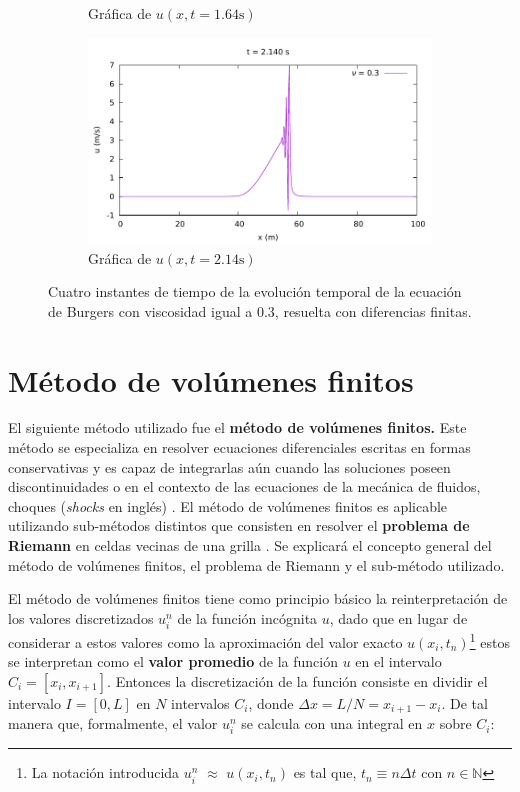 \documentclass[12pt]{article}
\begin{document}
\begin{figure}[ht]
\begin{subfigure}[b]{0.4\textwidth}
			\caption*{Gráfica de $u(x,t=1.64\unit{\second})$}
			\label{fig:vis0.3-3}
		\end{subfigure}
		\hfill
		\begin{subfigure}[b]{0.4\textwidth}
			\includegraphics[width=\textwidth]{../burg-vis1DDF/results/frames0.3/frame107.pdf}
			\caption*{Gráfica de $u(x,t=2.14\unit{\second})$}
			\label{fig:vis0.3-4}
		\end{subfigure}
		\caption{Cuatro instantes de tiempo de la evolución temporal de la ecuación de Burgers con viscosidad igual a $0.3$, resuelta con diferencias finitas.}
		\label{fig:instantes-nu0.3}
	\end{figure}
	
	\section{Método de volúmenes finitos}
	El siguiente método utilizado fue el \textbf{método de volúmenes finitos.} Este método se especializa en resolver ecuaciones diferenciales escritas en formas conservativas y es capaz de integrarlas aún cuando las soluciones poseen discontinuidades o  en el contexto de las ecuaciones de la mecánica de fluidos, choques (\textit{shocks} en inglés) \cite{LeVeque1998}. El método de volúmenes finitos es aplicable utilizando sub-métodos distintos que consisten en resolver el \textbf{problema de Riemann} en celdas vecinas de una grilla \cite{LeVeque1998}. Se explicará el concepto general del método de volúmenes finitos, el problema de Riemann y el sub-método utilizado.
	
	El método de volúmenes finitos tiene como principio básico la reinterpretación de los valores discretizados $u_{i}^{n}$ de la función incógnita $u$, dado que en lugar de considerar a estos valores como la aproximación del valor exacto $u(x_{i}, t_{n}) $\footnote{La notación introducida $u_{i}^{n}$ $\approx$ $u(x_{i}, t_{n})$ es tal que, $t_n \equiv n \Delta t $ con $n \in \mathbb{N}$} estos se interpretan como el \textbf{valor promedio} de la función $u$ en el intervalo $C_{i} = \left[ x_i, x_{i+1} \right]$. Entonces la discretización de la función consiste en dividir el intervalo $I = [0,L]$ en $N$ intervalos $C_i$, donde $\Delta x = L/N = x_{i+1} - x_i$. De tal manera que, formalmente, el valor $u_{i}^{n}$ se calcula con una integral en $x$ sobre $C_i$:
	
\end{document}

